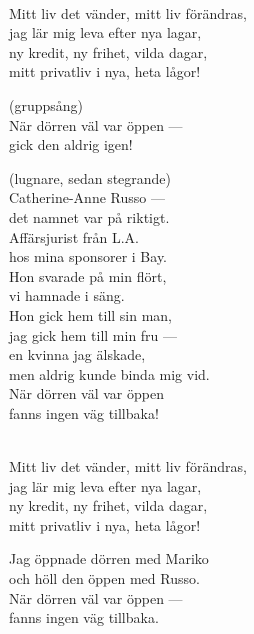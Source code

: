 \begin{lyrics}
\\
Mitt liv det vänder, mitt liv förändras,\\
jag lär mig leva efter nya lagar,\\
ny kredit, ny frihet, vilda dagar,\\
mitt privatliv i nya, heta lågor!

 (gruppsång)\\
När dörren väl var öppen —\\
gick den aldrig igen!

 (lugnare, sedan stegrande)\\
Catherine-Anne Russo —\\
det namnet var på riktigt.\\
Affärsjurist från L.A.\\
hos mina sponsorer i Bay.\\
Hon svarade på min flört,\\
vi hamnade i säng.\\
Hon gick hem till sin man,\\
jag gick hem till min fru —\\
en kvinna jag älskade,\\
men aldrig kunde binda mig vid.\\
När dörren väl var öppen\\
fanns ingen väg tillbaka!

\\
Mitt liv det vänder, mitt liv förändras,\\
jag lär mig leva efter nya lagar,\\
ny kredit, ny frihet, vilda dagar,\\
mitt privatliv i nya, heta lågor!

Jag öppnade dörren med Mariko\\
och höll den öppen med Russo.\\
När dörren väl var öppen —\\
fanns ingen väg tillbaka.
\end{lyrics}

